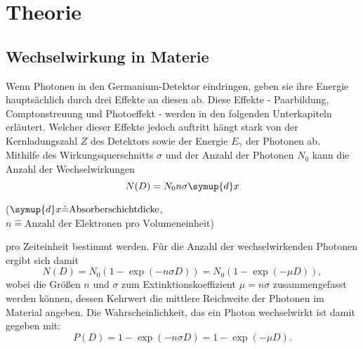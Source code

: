 \section{Theorie}
\subsection{Wechselwirkung in Materie}
Wenn Photonen in den Germanium-Detektor eindringen, geben sie ihre Energie hauptsächlich durch drei Effekte an diesen ab.
Diese Effekte - Paarbildung, Comptonstreuung und Photoeffekt - werden in den folgenden Unterkapiteln erläutert.
Welcher dieser Effekte jedoch auftritt hängt stark von der Kernladungszahl $Z$ des Detektors sowie der Energie $E_\gamma$ der Photonen ab. \\
Mithilfe des Wirkungsquerschnitts $\sigma$ und der Anzahl der Photonen $N_0$ kann die Anzahl der Wechselwirkungen
\begin{equation}
    N(D) = N_0 n \sigma \symup{d}x
\end{equation}
\begin{center}
    \tiny($ \symup{d}x \hat{=} \text{Absorberschichtdicke}$, $n \hat{=} \text{Anzahl der Elektronen pro Volumeneinheit}$)
\end{center}
pro Zeiteinheit bestimmt werden.
Für die Anzahl der wechselwirkenden Photonen ergibt sich damit
\begin{equation}
    N(D) = N_0 \left( 1 - \exp{(- n \sigma D )} \right) = N_0 \left( 1 - \exp{(- \mu D )} \right),
\end{equation}
wobei die Größen $n$ und $\sigma$ zum Extinktionskoeffizient $\mu = n \sigma$ zusammengefasst werden können, dessen Kehrwert die mittlere Reichweite der Photonen im Material angeben.
Die Wahrscheinlichkeit, das ein Photon wechselwirkt ist damit gegeben mit:
\begin{equation}
    P(D) = 1 - \exp{(- n \sigma D )}=  1 - \exp{(- \mu D )}. \label{eqn:WW_wahrscheinlichkeit}
\end{equation}


